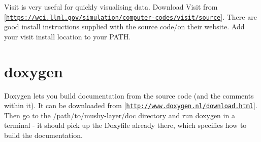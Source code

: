 Visit is very useful for quickly visualising data. Download Visit from \mbox{[}\href{https://wci.llnl.gov/simulation/computer-codes/visit/source}{\tt https\+://wci.\+llnl.\+gov/simulation/computer-\/codes/visit/source}\mbox{]}. There are good install instructions supplied with the source code/on their website. Add your visit install location to your P\+A\+TH.

\section*{doxygen}

Doxygen let\textquotesingle{}s you build documentation from the source code (and the comments within it). It can be downloaded from \mbox{[}\href{http://www.doxygen.nl/download.html}{\tt http\+://www.\+doxygen.\+nl/download.\+html}\mbox{]}. Then go to the {\ttfamily /path/to/mushy-\/layer/doc} directory and run {\ttfamily doxygen} in a terminal -\/ it should pick up the {\ttfamily Doxyfile} already there, which specifies how to build the documentation. 